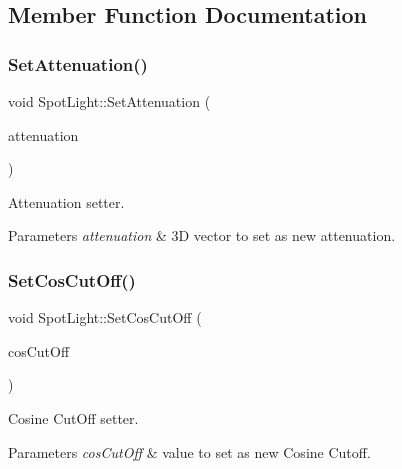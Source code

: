 \subsection{Member Function Documentation}
\mbox{\label{class_spot_light_addcb3fc1007d25b33f4275ff16f26073}} 
\subsubsection{\texorpdfstring{Set\+Attenuation()}{SetAttenuation()}}
{\footnotesize\ttfamily void Spot\+Light\+::\+Set\+Attenuation (\begin{DoxyParamCaption}\item[{glm\+::vec3}]{attenuation }\end{DoxyParamCaption})}



Attenuation setter. 


\begin{DoxyParams}{Parameters}
{\em attenuation} & 3D vector to set as new attenuation. \\
\hline
\end{DoxyParams}
\mbox{\label{class_spot_light_ac7a4c2343ed2d8da4f2511d50318cb5f}} 
\subsubsection{\texorpdfstring{Set\+Cos\+Cut\+Off()}{SetCosCutOff()}}
{\footnotesize\ttfamily void Spot\+Light\+::\+Set\+Cos\+Cut\+Off (\begin{DoxyParamCaption}\item[{G\+Lfloat}]{cos\+Cut\+Off }\end{DoxyParamCaption})}



Cosine Cut\+Off setter. 


\begin{DoxyParams}{Parameters}
{\em cos\+Cut\+Off} & value to set as new Cosine Cutoff. \\
\hline
\end{DoxyParams}
\mbox{\label{class_spot_light_ac8239339ffa7dd31ea07a4cdcc36c4f4}} 

